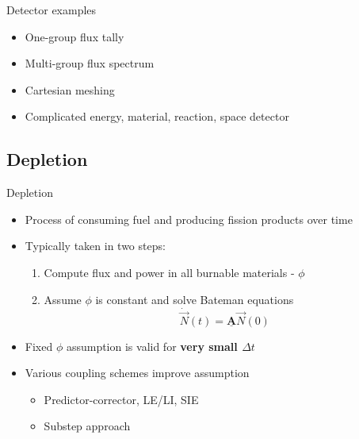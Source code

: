 \documentclass{beamer}
\begin{document}
\begin{frame}{Detector examples}
    \begin{itemize}
        \item One-group flux tally
        \item Multi-group flux spectrum
        \item Cartesian meshing
        \item Complicated energy, material, reaction, space detector
    \end{itemize}
\end{frame}

\subsection{Depletion}
\begin{frame}{Depletion}
    \begin{itemize}
        \item Process of consuming fuel and producing fission products over time
        \item Typically taken in two steps:
            \begin{enumerate}
                \item Compute flux and power in all burnable materials - $\phi$
                \item Assume $\phi$ is constant and solve Bateman equations
                \begin{equation}
                    \dot{\vec{N}}(t)=\underline{\mathbf{A}}\vec{N}(0)
                \end{equation}
            \end{enumerate}
        \item Fixed $\phi$ assumption is valid for \textbf{very small $\Delta t$}
        \item Various coupling schemes improve assumption
            \begin{itemize}
                \item Predictor-corrector, LE/LI, SIE
                \item Substep approach
            \end{itemize}
    \end{itemize}
\end{frame}
\end{document}
